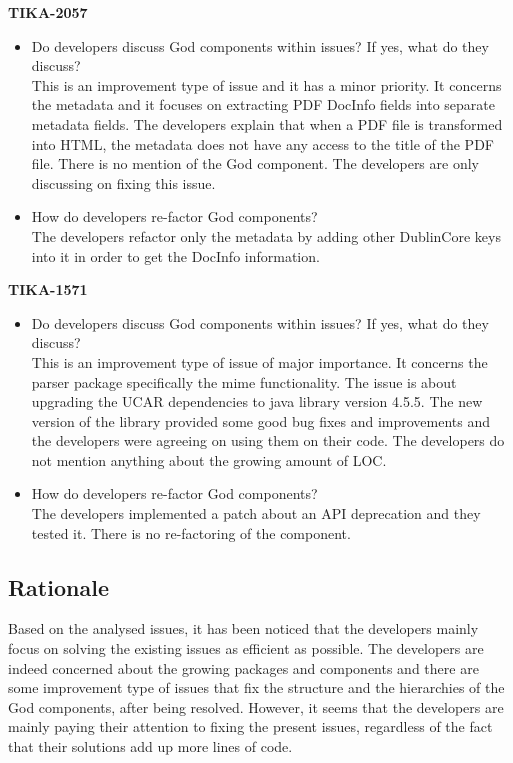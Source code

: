 \documentclass{article}
\begin{document}
\textbf{TIKA-2057}
\begin{itemize}
    \item Do developers discuss God components within issues? If yes, what do they discuss?\\
    This is an improvement type of issue and it has a minor priority. It concerns the metadata and it focuses on extracting PDF DocInfo fields into separate metadata fields. The developers explain that when a PDF file is transformed into HTML, the metadata does not have any access to the title of the PDF file. There is no mention of the God component. The developers are only discussing on fixing this issue. 
    \item How do developers re-factor God components?\\
    The developers refactor only the metadata by  adding other DublinCore keys into it in order to get the DocInfo information.
\end{itemize}

\textbf{TIKA-1571}
\begin{itemize}
    \item Do developers discuss God components within issues? If yes, what do they discuss?\\
    This is an improvement type of issue of major importance. It concerns the parser package specifically the mime functionality. The issue is about upgrading the UCAR dependencies to java library version 4.5.5. The new version of the library provided some good bug fixes and improvements and the developers were agreeing on using them on their code. The developers do not mention anything about the growing amount of LOC.
    \item How do developers re-factor God components?\\
    The developers implemented a patch about an API deprecation and they tested it. There is no re-factoring of the component.
\end{itemize}

\subsection{Rationale}
Based on the analysed issues, it has been noticed that the developers mainly focus on solving the existing issues as efficient as possible. The developers are indeed concerned about the growing packages and components and there are some improvement type of issues that fix the structure and the hierarchies of the God components, after being resolved. However, it seems that the developers are mainly paying their attention to fixing the present issues, regardless of the fact that their solutions add up more lines of code. 

\end{document}
